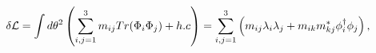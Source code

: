 \begin{equation}
\delta {\cal L} = \int d\theta^2 \left( \sum_{i,j=1}^3 m_{ij} 
Tr(\Phi_i \Phi_j) + h.c \right) = \sum_{i,j=1}^3
\left(m_{ij} \lambda_i \lambda_j + m_{ik}m_{kj}^* \phi_i^{\dagger}  
\phi_j\right),
\end{equation}

